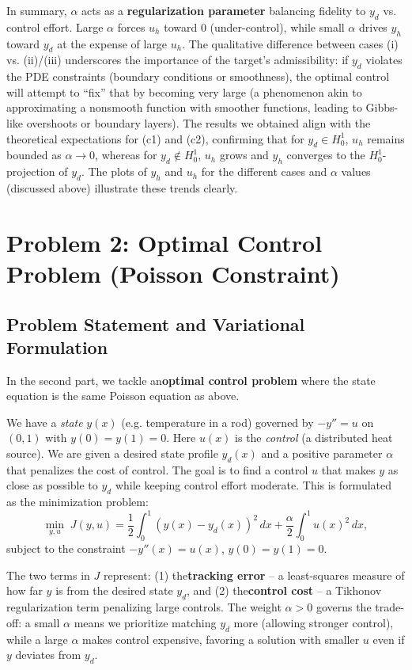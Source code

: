 \documentclass[a4paper,10pt]{article}
\begin{document}
In summary, \(\alpha\) acts as a \textbf{regularization parameter} balancing fidelity to \(y_d\) vs. control effort.
Large \(\alpha\) forces \(u_h\) toward 0 (under-control), while small \(\alpha\) drives \(y_h\) toward \(y_d\) at the expense of large \(u_h\). The qualitative difference between cases (i) vs. (ii)/(iii) underscores the importance of the target's admissibility: if \(y_d\) violates the PDE constraints (boundary conditions or smoothness), the optimal control will attempt to “fix” that by becoming very large (a phenomenon akin to approximating a nonsmooth function with smoother functions, leading to Gibbs-like overshoots or boundary layers). The results we obtained align with the theoretical expectations for (c1) and (c2), confirming that for \(y_d\in H^1_0\), \(u_h\) remains bounded as \(\alpha\to 0\), whereas for \(y_d\notin H^1_0\), \(u_h\) grows and \(y_h\) converges to the \(H^1_0\)-projection of \(y_d\).
The plots of \(y_h\) and \(u_h\) for the different cases and \(\alpha\) values (discussed above) illustrate these trends clearly.

\section{Problem 2: Optimal Control Problem (Poisson Constraint)}

\subsection{Problem Statement and Variational Formulation}
In the second part, we tackle an\textbf{optimal control problem} where the state equation is the same Poisson equation as above.

We have a \emph{state} \(y(x)\) (e.g. temperature in a rod) governed by \(-y'' = u\) on \((0,1)\) with \(y(0)=y(1)=0\).
Here \(u(x)\) is the \emph{control} (a distributed heat source).
We are given a desired state profile \(y_d(x)\) and a positive parameter \(\alpha\) that penalizes the cost of control.
The goal is to find a control \(u\) that makes \(y\) as close as possible to \(y_d\) while keeping control effort moderate.
This is formulated as the minimization problem:
\[\min_{y,u} \; J(y,u) = \frac{1}{2}\int_0^1 (y(x) - y_d(x))^2\,dx + \frac{\alpha}{2}\int_0^1 u(x)^2\,dx,\]
subject to the constraint \(-y''(x) = u(x)\), \(y(0)=y(1)=0\).

The two terms in \(J\) represent: (1) the\textbf{tracking error} – a least-squares measure of how far \(y\) is from the desired state \(y_d\), and (2) the\textbf{control cost} – a Tikhonov regularization term penalizing large controls. The weight \(\alpha > 0\) governs the trade-off: a small \(\alpha\) means we prioritize matching \(y_d\) more (allowing stronger control), while a large \(\alpha\) makes control expensive, favoring a solution with smaller \(u\) even if \(y\) deviates from \(y_d\).
\end{document}
